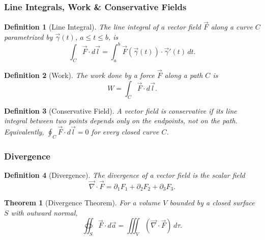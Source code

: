 \documentclass{article}
\newtheorem{theorem}{Theorem}
\newtheorem{definition}{Definition}
\begin{document}
\subsubsection{Line Integrals, Work \& Conservative Fields}
\begin{definition}[Line Integral]
    The line integral of a vector field $\vec{F}$ along a curve $C$ parametrized by $\vec{\gamma}(t)$, $a\le t\le b$, is
    \begin{equation}
        \label{eq:line-integral}
        \int_C \vec{F}\cdot d\vec{l} = \int_a^b \vec{F}(\vec{\gamma}(t))\cdot\vec{\gamma}'(t)\,dt.
    \end{equation}
\end{definition}
\begin{definition}[Work]
    The work done by a force $\vec{F}$ along a path $C$ is
    \begin{equation}
        \label{eq:work}
        W = \int_C \vec{F}\cdot d\vec{l}.
    \end{equation}
\end{definition}
\begin{definition}[Conservative Field]
    A vector field is conservative if its line integral between two points depends only on the endpoints, not on the path. Equivalently, $\oint_C \vec{F}\cdot d\vec{l} = 0$ for every closed curve $C$.
\end{definition}

\subsubsection{Divergence}
\begin{definition}[Divergence]
    The divergence of a vector field is the scalar field
    \begin{equation}
        \label{eq:divergence}
        \vec{\nabla}\cdot\vec{F} = \partial_1 F_1 + \partial_2 F_2 + \partial_3 F_3.
    \end{equation}
\end{definition}
\begin{theorem}[Divergence Theorem]
    For a volume $V$ bounded by a closed surface $S$ with outward normal,
    \begin{equation}
        \label{eq:divergence-theorem}
        \oiint_S \vec{F}\cdot d\vec{a} = \iiint_V(\vec{\nabla}\cdot\vec{F})\,d\tau.
    \end{equation}
\end{theorem}
\end{document}
